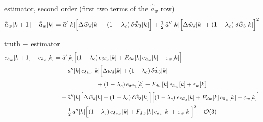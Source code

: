 \documentclass[11pt,a4paper,fontset=none]{ctexart}
\newcommand{\ba}{\bar{a}}
\newcommand{\bw}{\bar{w}}
\begin{document}
estimator, second order (first two terms of the $\hat{\ba}_w$ row)
\begin{equation*}
\hat{\ba}_w[k+1] - \hat{\ba}_w[k]
  = \ba'[k]\Bigl[\Delta\bw_d[k] + (1-\lambda_c)\,\delta\hat{\bw}_3[k]\Bigr]
  + \tfrac{1}{2}\,\ba''[k]\Bigl[\Delta\bw_d[k] + (1-\lambda_c)\,\delta\hat{\bw}_3[k]\Bigr]^{2}
\end{equation*}

truth $-$ estimator
\begin{align*}
e_{\ba_w}[k+1] - e_{\ba_w}[k]
  &= \ba'[k]\Bigl[(1-\lambda_c)\,e_{\delta\bw_3}[k] + F_{dw}[k]\,e_{\ba_w}[k] + \varepsilon_w[k]\Bigr] \\
  &\quad - \ba''[k]\,e_{\delta\bw_3}[k]\Bigl[\Delta\bw_d[k] + (1-\lambda_c)\,\delta\hat{\bw}_3[k] \\
  &\qquad\qquad\qquad\quad
      + (1-\lambda_c)\,e_{\delta\bw_3}[k] + F_{dw}[k]\,e_{\ba_w}[k] + \varepsilon_w[k]\Bigr] \\
  &\quad + \ba''[k]\Bigl[\Delta\bw_d[k] + (1-\lambda_c)\,\delta\hat{\bw}_3[k]\Bigr]
     \Bigl[(1-\lambda_c)\,e_{\delta\bw_3}[k] + F_{dw}[k]\,e_{\ba_w}[k] + \varepsilon_w[k]\Bigr] \\
  &\quad + \tfrac{1}{2}\,\ba''[k]\Bigl[(1-\lambda_c)\,e_{\delta\bw_3}[k] + F_{dw}[k]\,e_{\ba_w}[k] + \varepsilon_w[k]\Bigr]^{2}
  + \mathcal{O}(3)
\end{align*}
\end{document}
